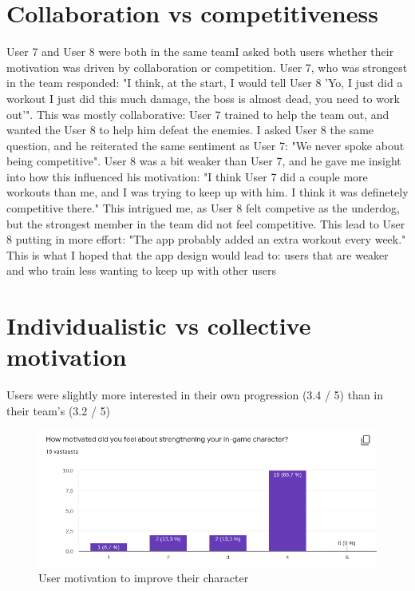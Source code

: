 \documentclass{l4proj}
\begin{document}
\section{Collaboration vs competitiveness}
User 7 and User 8 were both in the same teamI asked both users whether their motivation was driven by collaboration or competition. User 7, who was strongest in the team responded: "I think, at the start, I would tell User 8 'Yo, I just did a workout I just did this much damage, the boss is almost dead, you need to work out'". This was mostly collaborative: User 7 trained to help the team out, and wanted the User 8 to help him defeat the enemies. I asked User 8 the same question, and he reiterated the same sentiment as User 7: "We never spoke about being competitive". User 8 was a bit weaker than User 7, and he gave me insight into how this influenced his motivation: "I think User 7 did a couple more workouts than me, and I was trying to keep up with him. I think it was definetely competitive there." This intrigued me, as User 8 felt competive as the underdog, but the strongest member in the team did not feel competitive. This lead to User 8 putting in more effort: "The app probably added an extra workout every week." This is what I hoped that the app design would lead to: users that are weaker and who train less wanting to keep up with other users



\section{Individualistic vs collective motivation}
Users were slightly more interested in their own progression (3.4 / 5) than in their team's (3.2 / 5)
\begin{figure}[H]
    \centering
    \includegraphics[width=1.0\linewidth]{ingame.png}    
    \caption{
      User motivation to improve their character
    }
    \label{fig:frogman} 
\end{figure}
\end{document}
